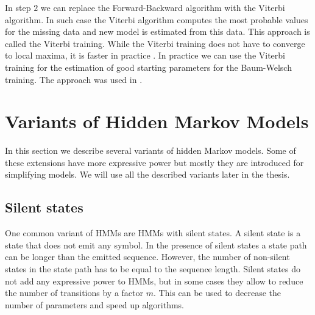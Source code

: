 In step $2$ we can replace the Forward-Backward algorithm with the Viterbi
algorithm. In such case the Viterbi algorithm computes the most probable values
for the missing data and new model is estimated from this data.
This approach is called the Viterbi training.  While the Viterbi training does
not have to converge to local maxima, it is faster in practice
\cite{Durbin1998}.  In practice we can use the Viterbi training for the
estimation of good starting parameters for the Baum-Welsch training. The
approach was used in \cite{FEAST2011}.

\section{Variants of Hidden Markov Models}

In this section we describe several variants of hidden Markov models.  Some of
these extensions have more expressive power but mostly they are introduced for
simplifying  models. We will use all the described variants later in the
thesis.

\subsection{Silent states}

One common variant of HMMs are HMMs with silent states. A silent state is a state
that does not emit any symbol. In the presence of silent states a state path can
be longer than the emitted sequence. However, the number of non-silent states in
the state path has to be equal to the sequence length. Silent states do not
add any expressive power to HMMs, but in some cases they allow to reduce the
number of transitions by a factor $m$. This can be used to decrease the number of
parameters and speed up algorithms. 

